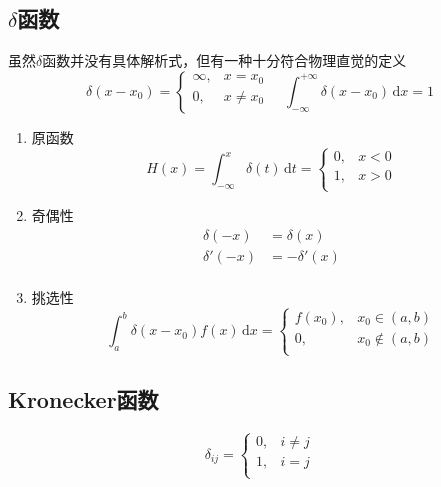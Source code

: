 \subsection{\texorpdfstring{$\delta$}{δ}函数}
虽然$\delta$函数并没有具体解析式，但有一种十分符合物理直觉的定义
$$
    \delta(x-x_0) = \begin{cases}
        \infty, & x = x_0    \\
        0,      & x \neq x_0 \\
    \end{cases} \quad
    \int_{-\infty}^{+\infty} \delta(x-x_0) \,\mathrm{d}x = 1
$$
\begin{enumerate}
    \item 原函数
          \begin{equation}\label{delta函数的原函数}
              H(x)=\int_{-\infty}^{x} \delta(t) \,\mathrm{d}t
              =\begin{cases}
                  0, & x<0 \\
                  1, & x>0 \\
              \end{cases}
          \end{equation}
    \item 奇偶性
          \begin{equation}\label{delta函数的奇偶性}
              \begin{aligned}
                  \delta(-x)  & = \delta(x)   \\
                  \delta'(-x) & = -\delta'(x) \\
              \end{aligned}
          \end{equation}
    \item 挑选性
          \begin{equation}\label{delta函数的挑选性}
              \int_{a}^{b}\delta(x-x_0)f(x)\,\mathrm{d}x
              =\begin{cases}
                  f(x_0), & x_0\in(a,b)    \\
                  0,      & x_0\notin(a,b) \\
              \end{cases}
          \end{equation}
\end{enumerate}

\subsection{Kronecker函数}
\begin{equation}
    \delta_{ij} = \begin{cases}
        0, & i \neq j \\
        1, & i = j    \\
    \end{cases}
\end{equation}

